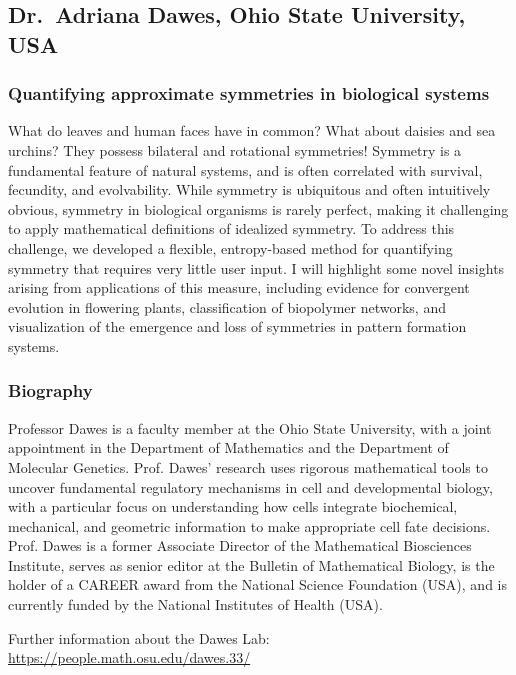 \documentclass[12pt,a4paper]{article}
\begin{document}
\subsection{Dr.~Adriana Dawes, Ohio State University, USA}

\subsubsection{Quantifying approximate symmetries in biological systems}

What do leaves and human faces have in common? What about daisies and sea urchins? They possess bilateral and rotational symmetries! Symmetry is a fundamental feature of natural systems, and is often correlated with survival, fecundity, and evolvability. While symmetry is ubiquitous and often intuitively obvious, symmetry in biological organisms is rarely perfect, making it challenging to apply mathematical definitions of idealized symmetry. To address this challenge, we developed a flexible, entropy-based method for quantifying symmetry that requires very little user input. I will highlight some novel insights arising from applications of this measure, including evidence for convergent evolution in flowering plants, classification of biopolymer networks, and visualization of the emergence and loss of symmetries in pattern formation systems.

\subsubsection{Biography}

Professor Dawes is a faculty member at the Ohio State University, with a joint appointment in the Department of Mathematics and the Department of Molecular Genetics. Prof. Dawes' research uses rigorous mathematical tools to uncover fundamental regulatory mechanisms in cell and developmental biology, with a particular focus on understanding how cells integrate biochemical, mechanical, and geometric information to make appropriate cell fate decisions. Prof. Dawes is a former Associate Director of the Mathematical Biosciences Institute, serves as senior editor at the Bulletin of Mathematical Biology, is the holder of a CAREER award from the National Science Foundation (USA), and is currently funded by the National Institutes of Health (USA).

Further information about the Dawes Lab: \href{https://people.math.osu.edu/dawes.33/}{https://people.math.osu.edu/dawes.33/}
\end{document}
